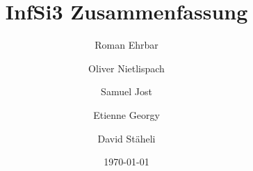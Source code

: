 \documentclass[10pt,a4paper]{article}
\title{InfSi3 Zusammenfassung}
\author{
	Roman Ehrbar\\
	\and
	Oliver Nietlispach\\
	\and
	Samuel Jost\\
	\and
	Etienne Georgy\\
	\and
	David Stäheli
	}
\date{\today}
\begin{document}
\maketitle
\tableofcontents
\listoftodos
\newpage 






















\end{document}
